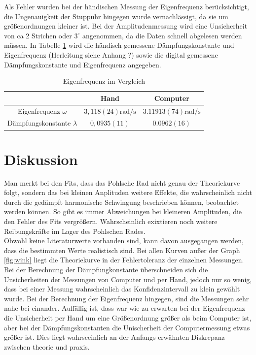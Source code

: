 \documentclass[11pt, a4paper]{article}
\begin{document}
    Als Fehler wurden bei der händischen Messung der Eigenfrequenz berücksichtigt, die Ungenauigkeit der Stuppuhr hingegen
    wurde vernachlässigt, da sie um größenordnungen kleiner ist. Bei der Amplitudenmessung wird eine Unsicherheit von ca 2 Strichen
    oder $3^{\circ}$ angenommen, da die Daten schnell abgelesen werden müssen.
    In Tabelle \ref{Tab:tableeig} wird die händisch gemessene Dämpfungskonstante und Eigenfrequenz (Herleitung siehe Anhang ?) sowie die
    digital gemessene Dämpfungskonstante und Eigenfrequenz angegeben. 
    \begin{table}[H]
        \centering
        \begin{tabular}{c c c} 
            & Hand & Computer \\ \hline
            Eigenfrequenz $\omega$ & $3,118(24) \si{\radian\per\second}$ & $3.11913(74) \si{\radian\per\second}$ \\
            Dämpfungskonstante $\lambda$ & $0,0935(11)$ & $0.0962(16)$

            
        \end{tabular}
        \caption{Eigenfrequenz im Vergleich}
        \label{Tab:tableeig}
    \end{table}

    \section{Diskussion}

    Man merkt bei den Fits, dass das Pohlsche Rad nicht genau der Theoriekurve folgt, sondern das bei kleinen Anplituden
    weitere Effekte, die wahrscheinlich nicht durch die gedämpft harmonische Schwingung beschrieben können, beobachtet werden können.
    So gibt es immer Abweichungen bei kleineren Amplituden, die den Fehler des Fits vergrößern. Wahrscheinlich exixtieren noch weitere
    Reibungskräfte im Lager des Pohlschen Rades. \\

    Obwohl keine Literaturwerte vorhanden sind, kann davon ausgegangen werden, dass die bestimmten Werte realistisch sind.
    Bei allen Kurven außer der Graph \ref{fig:wink} liegt die Theoriekurve in der Fehlertoleranz der einzelnen Messungen.
    Bei der Berechnung der Dämpfungkonstante überschneiden sich die Unsicherheiten der Messungen von Computer und per Hand,
    jedoch nur so  wenig, dass bei einer Messung wahrscheinlich das Konfidenzintervall zu klein gewählt wurde. Bei der
    Berechnung der Eigenfrequenz hingegen, sind die Messungen sehr nahe bei einander. Auffällig ist, dass war wie zu
    erwarten bei der Eigenfrequenz die Unsicherheit per Hand um eine Größenordnung größer als beim Computer ist,
    aber bei der Dämpfungskonstanten die Unischerheit der Computermessung etwas größer ist. Dies liegt wahrsceinlich an der Anfangs
    erwähnten Diskrepanz zwischen theorie und praxis.
\end{document}
